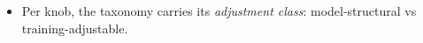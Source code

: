 \begin{itemize}
    \item Per knob, the taxonomy carries its \emph{adjustment class}: model-structural vs training-adjustable. 

\end{itemize}
